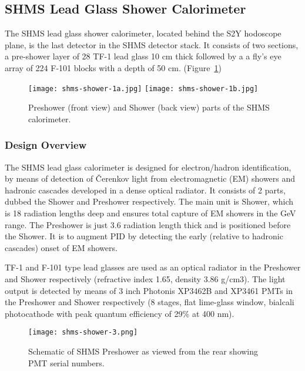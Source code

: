 
\subsection{SHMS Lead Glass Shower Calorimeter}

The SHMS lead glass shower calorimeter, located behind the S2Y
hodoscope plane, is the last detector in the SHMS detector stack.  It
consists of two sections, a pre-shower layer of 28 TF-1 lead glass 10
cm thick followed by a a fly's eye array of 224 F-101 blocks with a
depth of 50 cm.  (Figure~\ref{fig:shms-shower-1})

\begin{figure}
\begin{center}
\texttt{[image: shms-shower-1a.jpg]}
\texttt{[image: shms-shower-1b.jpg]}
\caption{\label{fig:shms-shower-1}Preshower (front view) and Shower
  (back view) parts of the SHMS calorimeter.}
\end{center}
\end{figure}


\subsubsection{Design Overview}

The SHMS lead glass calorimeter is designed for electron/hadron
identification, by means of detection of \v{C}erenkov light from
electromagnetic (EM) showers and hadronic cascades developed in a
dense optical radiator. It consists of 2 parts, dubbed the Shower and
Preshower respectively. The main unit is Shower, which is 18 radiation
lengths deep and ensures total capture of EM showers in the GeV range. The
Preshower is just 3.6 radiation length thick and is positioned before
the Shower. It is to augment PID by detecting the early (relative to
hadronic cascades) onset of EM showers.

TF-1 and F-101 type lead glasses are used as an optical radiator in
the Preshower and Shower respectively (refractive index 1.65, density
3.86 g/cm3). The light output is detected by means of 3 inch Photonis
XP3462B and XP3461 PMTs in the Preshower and Shower respectively (8
stages, flat lime-glass window, bialcali photocathode with peak
quantum efficiency of 29\% at 400 nm).

\begin{figure}
\begin{center}
\texttt{[image: shms-shower-3.png]}
\caption{\label{fig:shms-shower-3}Schematic of SHMS Preshower as
  viewed from the rear showing PMT serial numbers.}
\end{center}
\end{figure}

